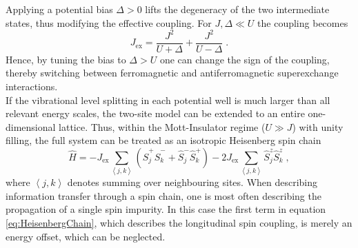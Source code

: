 Applying a potential bias $\Delta > 0$ lifts the degeneracy of the two intermediate states, thus modifying the effective coupling. For $J,\Delta \ll U$ the coupling becomes
\begin{equation}
	J_{\mathrm{ex}} = \frac{J^2}{U + \Delta} + \frac{J^2}{U - \Delta} \; . \label{eq:Jex_delta}
\end{equation}
Hence, by tuning the bias to $\Delta > U$ one can change the sign of the coupling, thereby switching between ferromagnetic and antiferromagnetic superexchange interactions.\\
If the vibrational level splitting in each potential well is much larger than all relevant energy scales, the two-site model can be extended to an entire one-dimensional lattice. Thus, within the Mott-Insulator regime ($U \gg J$) with unity filling, the full system can be treated as an isotropic Heisenberg spin chain
\begin{equation}
	\hat{H} = - J_{\mathrm{ex}} \sum_{\left\langle j, k \right\rangle} \left( \hat{S}_{j}^{+} \hat{S}_{k}^{-} + \hat{S}_{j}^{-} \hat{S}_{k}^{+} \right) - 2 J_{\mathrm{ex}} \sum_{\left\langle j, k \right\rangle} \hat{S}_{j}^{z} \hat{S}_{k}^{z} \; , \label{eq:HeisenbergChain}
\end{equation}
where $\left\langle j, k \right\rangle$ denotes summing over neighbouring sites.
When describing information transfer through a spin chain, one is most often describing the propagation of a single spin impurity. In this case the first term in equation \ref{eq:HeisenbergChain}, which describes the longitudinal spin coupling, is merely an energy offset, which can be neglected. 